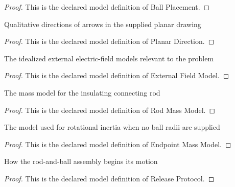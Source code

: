 \begin{proof}
  This is the declared model definition of Ball Placement.
\end{proof}
\begin{definition}
  \label{def:physics:phyx-mini-0910:phyxminiproblems-problemphyxmini0910-planardirection}
  Qualitative directions of arrows in the supplied planar drawing
\end{definition}
\begin{proof}
  This is the declared model definition of Planar Direction.
\end{proof}
\begin{definition}
  \label{def:physics:phyx-mini-0910:phyxminiproblems-problemphyxmini0910-externalfieldmodel}
  The idealized external electric-field models relevant to the problem
\end{definition}
\begin{proof}
  This is the declared model definition of External Field Model.
\end{proof}
\begin{definition}
  \label{def:physics:phyx-mini-0910:phyxminiproblems-problemphyxmini0910-rodmassmodel}
  The mass model for the insulating connecting rod
\end{definition}
\begin{proof}
  This is the declared model definition of Rod Mass Model.
\end{proof}
\begin{definition}
  \label{def:physics:phyx-mini-0910:phyxminiproblems-problemphyxmini0910-endpointmassmodel}
  The model used for rotational inertia when no ball radii are supplied
\end{definition}
\begin{proof}
  This is the declared model definition of Endpoint Mass Model.
\end{proof}
\begin{definition}
  \label{def:physics:phyx-mini-0910:phyxminiproblems-problemphyxmini0910-releaseprotocol}
  How the rod-and-ball assembly begins its motion
\end{definition}
\begin{proof}
  This is the declared model definition of Release Protocol.
\end{proof}

